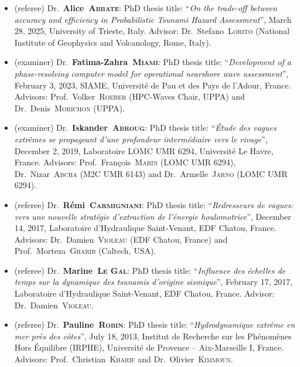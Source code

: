 \documentclass[final, a4paper, oneside, 12pt]{article}
\numberwithin{equation}{section}
\begin{document}
\begin{itemize}

  \item (referee) Dr.~\textbf{Alice~\textsc{Abbate}}: PhD thesis title: ``\textit{On the trade-off between accuracy and efficiency in Probabilistic Tsunami Hazard Assessment}'', March 28, 2025, University of Trieste, Italy. Advisor: Dr.~Stefano~\textsc{Lorito} (National Institute of Geophysics and Volcanology, Rome, Italy).

  \item (examiner) Dr.~\textbf{Fatima-Zahra~\textsc{Miami}}: PhD thesis title: ``\textit{Development of a phase-resolving computer model for operational nearshore wave assessment}'', February 3, 2023, SIAME, Universit\'e de Pau et des Pays de l'Adour, France. Advisors: Prof.~Volker~\textsc{Roeber} (HPC-Waves Chair, UPPA) and Dr.~Denis~\textsc{Morichon} (UPPA). 

  \item (examiner) Dr.~\textbf{Iskander~\textsc{Abroug}}: PhD thesis title: ``\textit{\'Etude des vagues extr\^emes se propageant d'une profondeur interm\'ediaire vers le rivage}'', December 2, 2019, Laboratoire LOMC UMR 6294, Universit\'e Le Havre, France. Advisors: Prof.~Fran\c{c}ois~\textsc{Marin} (LOMC UMR 6294), Dr.~Nizar~\textsc{Abcha} (M2C UMR 6143) and Dr.~Armelle~\textsc{Jarno} (LOMC UMR 6294).

  \item (referee) Dr.~\textbf{R\'emi~\textsc{Carmigniani}}: PhD thesis title: ``\textit{Redresseurs de vagues: vers une nouvelle strat\'egie d'extraction de l'\'energie houlomotrice}'', December 14, 2017, Laboratoire d'Hydraulique Saint-Venant, EDF Chatou, France. Advisors: Dr.~Damien~\textsc{Violeau} (EDF Chatou, France) and Prof.~Morteza~\textsc{Gharib} (Caltech, USA).

  \item (referee) Dr.~\textbf{Marine~\textsc{Le Gal}}: PhD thesis title: ``\textit{Influence des \'echelles de temps sur la dynamique des tsunamis d'origine sismique}'', February 17, 2017, Laboratoire d'Hydraulique Saint-Venant, EDF Chatou, France. Advisor: Dr.~Damien~\textsc{Violeau}.
  
  \item (referee) Dr.~\textbf{Pauline~\textsc{Robin}}: PhD thesis title: ``\textit{Hydrodynamique extr\^eme en mer pr\`es des c\^otes}'', July 18, 2013, Institut de Recherche sur les Ph\'enom\`enes Hors \'Equilibre (IRPHE), Universit\'e de Provence -- Aix-Marseille I, France. Advisors: Prof.~Christian~\textsc{Kharif} and Dr.~Olivier~\textsc{Kimmoun}.


\end{itemize}
\end{document}
